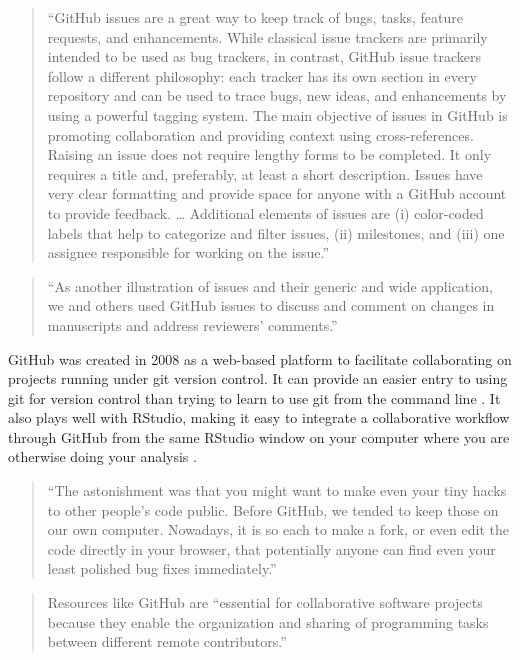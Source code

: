 \documentclass[]{tufte-book}
\begin{document}
\begin{quote}
``GitHub issues are a great way to keep track of bugs, tasks, feature requests,
and enhancements. While classical issue trackers are primarily intended to be
used as bug trackers, in contrast, GitHub issue trackers follow a different
philosophy: each tracker has its own section in every repository and can be used
to trace bugs, new ideas, and enhancements by using a powerful tagging system.
The main objective of issues in GitHub is promoting collaboration and providing
context using cross-references. Raising an issue does not require lengthy forms
to be completed. It only requires a title and, preferably, at least a short description.
Issues have very clear formatting and provide space for anyone with a GitHub account
to provide feedback. \ldots{} Additional elements of issues are (i) color-coded labels
that help to categorize and filter issues, (ii) milestones, and (iii) one assignee
responsible for working on the issue.'' \citep{perez2016ten}
\end{quote}

\begin{quote}
``As another illustration of issues and their generic and wide application, we
and others used GitHub issues to discuss and comment on changes in manuscripts
and address reviewers' comments.'' \citep{perez2016ten}
\end{quote}

GitHub was created in 2008 as a web-based platform to facilitate collaborating
on projects running under git version control. It can provide an easier entry
to using git for version control than trying to learn to use git from the
command line \citep{perez2016ten}. It also plays well with RStudio, making it easy
to integrate a collaborative workflow through GitHub from the same RStudio
window on your computer where you are otherwise doing your analysis \citep{perez2016ten}.

\begin{quote}
``The astonishment was that you might want to make even your tiny hacks to
other people's code public. Before GitHub, we tended to keep those on our own
computer. Nowadays, it is so each to make a fork, or even edit the code directly
in your browser, that potentially anyone can find even your least polished
bug fixes immediately.'' \citep{irving2011astonishments}
\end{quote}

\begin{quote}
Resources like GitHub are ``essential for collaborative software projects
because they enable the organization and sharing of programming tasks between
different remote contributors.'' \citep{perez2016ten}
\end{quote}
\end{document}
